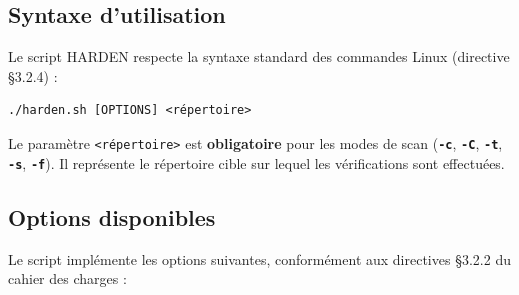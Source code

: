 \documentclass[12pt,a4paper]{article}
\newcommand{\opt}[1]{\texttt{\textcolor{bleuMed}{\textbf{#1}}}}
\begin{document}
\subsection{Syntaxe d'utilisation}

Le script HARDEN respecte la syntaxe standard des commandes Linux (directive §3.2.4) :

\begin{lstlisting}[style=bash]
./harden.sh [OPTIONS] <répertoire>
\end{lstlisting}

Le paramètre \texttt{<répertoire>} est \textbf{obligatoire} pour les modes de scan (\opt{-c}, \opt{-C}, \opt{-t}, \opt{-s}, \opt{-f}). Il représente le répertoire cible sur lequel les vérifications sont effectuées.

\subsection{Options disponibles}

Le script implémente les options suivantes, conformément aux directives §3.2.2 du cahier des charges :
\end{document}
